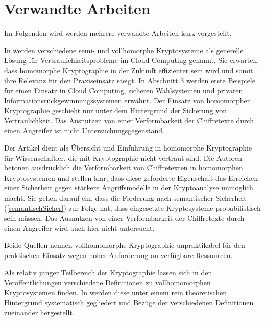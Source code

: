 \chapter{Verwandte Arbeiten}

Im Folgenden wird werden mehrere verwandte Arbeiten kurz vorgestellt.

In \cite{maimut2012homomorphic} werden verschiedene semi- und vollhomorphe Kryptosysteme als generelle Lösung für Vertraulichkeitsprobleme im Cloud Computing genannt. Sie erwarten, dass homomorphe Kryptographie in der Zukunft effizienter sein wird und somit ihre Relevanz für den Praxiseinsatz steigt. In Abschnitt 3 werden erste Beispiele für einen Einsatz in Cloud Computing, sicheren Wahlsystemen und privaten Informationsrückgewinnungssystemen erwähnt.
Der Einsatz von homomorpher Kryptographie geschieht nur unter dem Hintergrund der Sicherung von Vertraulichkeit. Das Ausnutzen von einer Verformbarkeit der Chiffretexte durch einen Angreifer ist nicht Untersuchungsgegenstand.

Der Artikel \cite{fontaine2007survey} dient als Übersicht und Einführung in homomorphe Kryptographie für Wissenschaftler, die mit Kryptographie nicht vertraut sind. Die Autoren betonen ausdrücklich die Verformbarkeit von Chiffretexten in homomorphen Kryptosystemen und stellen klar, dass diese geforderte Eigenschaft das Erreichen einer Sicherheit gegen stärkere Angriffsmodelle in der Kryptoanalyse unmöglich macht. Sie gehen  darauf ein, dass die Forderung nach semantischer Sicherheit (\ref{semantischSicher}) zur Folge hat, dass eingesetzte Kryptosysteme probabilistisch sein müssen.
Das Ausnutzen von einer Verformbarkeit der Chiffretexte durch einen Angreifer wird auch hier nicht untersucht.

Beide Quellen nennen vollhomomorphe Kryptographie unpraktikabel für den praktischen Einsatz wegen hoher Anforderung an verfügbare Ressourcen.

Als relativ junger Teilbereich der Kryptographie lassen sich in den Veröffentlichungen verschiedene Definitionen zu vollhomomorphen Kryptosystemen finden. In \cite{armknecht2015guide} werden diese unter einem rein theoretischen Hintergrund systematisch gegliedert und Bezüge der verschiedenen Definitionen zueinander hergestellt. 